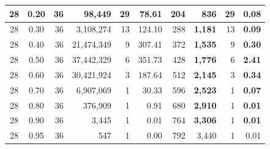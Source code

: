 \begin{table}[H]
\begin{tabular}{|c|c|r|r|r|r|r|r|r|r|}
        28                              & 0.20                               & 36                                              & 98,449                                             & 29            & 78.61         & 204           & \textbf{ 836}    & 29            & \textbf{0.08} \\ \hline
        28                              & 0.30                               & 36                                              & 3,108,274                                          & 13            & 124.10        & 288           & \textbf{1,181}   & 13            & \textbf{0.09} \\ \hline
        28                              & 0.40                               & 36                                              & 21,474,349                                         & 9             & 307.41        & 372           & \textbf{1,535}   & 9             & \textbf{0.30} \\ \hline
        28                              & 0.50                               & 36                                              & 37,442,329                                         & 6             & 351.73        & 428           & \textbf{1,776}   & 6             & \textbf{2.41} \\ \hline
        28                              & 0.60                               & 36                                              & 30,421,924                                         & 3             & 187.64        & 512           & \textbf{2,145}   & 3             & \textbf{0.34} \\ \hline
        28                              & 0.70                               & 36                                              & 6,907,069                                          & 1             & 30.33         & 596           & \textbf{2,523}   & 1             & \textbf{0.07} \\ \hline
        28                              & 0.80                               & 36                                              & 376,909                                            & 1             & 0.91          & 680           & \textbf{2,910}   & 1             & \textbf{0.01} \\ \hline
        28                              & 0.90                               & 36                                              & 3,445                                              & 1             & 0.01          & 764           & \textbf{3,306}   & 1             & \textbf{0.01} \\ \hline
        28                              & 0.95                               & 36                                              & 547                                                & 1             & 0.00          & 792           & 3,440            & 1             & 0.01          \\ \hline
    \end{tabular}
\end{table}

